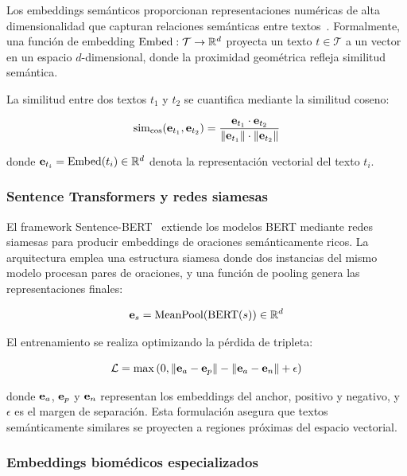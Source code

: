 Los embeddings semánticos proporcionan representaciones numéricas de alta dimensionalidad que capturan relaciones semánticas entre textos~\cite{reimers2019sentence}. Formalmente, una función de embedding $\operatorname{Embed}: \mathcal{T} \rightarrow \mathbb{R}^d$ proyecta un texto $t \in \mathcal{T}$ a un vector en un espacio $d$-dimensional, donde la proximidad geométrica refleja similitud semántica.

La similitud entre dos textos $t_1$ y $t_2$ se cuantifica mediante la similitud coseno:

\begin{equation}
\label{eq:cosine_similarity}
  \operatorname{sim_{cos}}(\mathbf{e}_{t_1}, \mathbf{e}_{t_2}) = \frac{\mathbf{e}_{t_1} \cdot \mathbf{e}_{t_2}}{\|\mathbf{e}_{t_1}\| \cdot \|\mathbf{e}_{t_2}\|}
\end{equation}

\noindent donde $\mathbf{e}_{t_i} = \operatorname{Embed}(t_i) \in \mathbb{R}^d$ denota la representación vectorial del texto $t_i$.

\subsubsection{Sentence Transformers y redes siamesas}

El framework Sentence-BERT~\cite{reimers2019sentence} extiende los modelos BERT mediante redes siamesas para producir embeddings de oraciones semánticamente ricos. La arquitectura emplea una estructura siamesa donde dos instancias del mismo modelo procesan pares de oraciones, y una función de pooling genera las representaciones finales:

\begin{equation}
\label{eq:sbert}
  \mathbf{e}_{s} = \text{MeanPool}(\text{BERT}(s)) \in \mathbb{R}^d
\end{equation}

El entrenamiento se realiza optimizando la pérdida de tripleta:

\begin{equation}
\label{eq:triplet_loss}
  \mathcal{L} = \max\left(0, \|\mathbf{e}_{a} - \mathbf{e}_{p}\| - \|\mathbf{e}_{a} - \mathbf{e}_{n}\| + \epsilon\right)
\end{equation}

\noindent donde $\mathbf{e}_{a}$, $\mathbf{e}_{p}$ y $\mathbf{e}_{n}$ representan los embeddings del anchor, positivo y negativo, y $\epsilon$ es el margen de separación. Esta formulación asegura que textos semánticamente similares se proyecten a regiones próximas del espacio vectorial.

\subsubsection{Embeddings biomédicos especializados}

